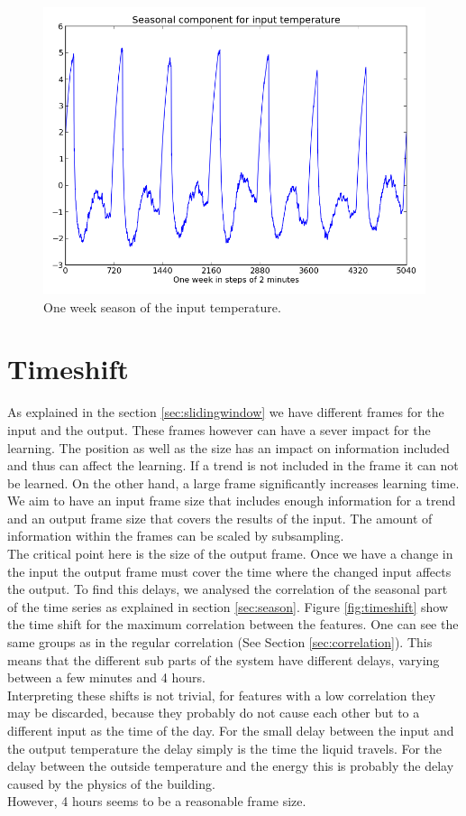 \documentclass{scrartcl}
\begin{document}
\begin{figure}[H]
  \centering
  \includegraphics[width=0.5\linewidth]{img/season-input-temperature.png}
  \caption{One week season of the input temperature.}
  \label{fig:season}
\end{figure}


\section{Timeshift}
As explained in the section \ref{sec:slidingwindow} we have different frames for the input and the output. These frames however can have a sever impact for the learning. The position as well as the size has an impact on information included and thus can affect the learning. If a trend is not included in the frame it can not be learned. On the other hand, a large frame significantly increases learning time. We aim to have an input frame size that includes enough information for a trend and an output frame size that covers the results of the input. The amount of information within the frames can be scaled by subsampling.\\
The critical point here is the size of the output frame. Once we have a change in the input the output frame must cover the time where the changed input affects the output. To find this delays, we analysed the correlation of the seasonal part of the time series as explained in section \ref{sec:season}. Figure \ref{fig:timeshift} show the time shift for the maximum correlation between the features. One can see the same groups as in the regular correlation (See Section \ref{sec:correlation}). This means that the different sub parts of the system have different delays, varying between a few minutes and 4 hours.\\
Interpreting these shifts is not trivial, for features with a low correlation they may be discarded, because they probably do not cause each other but to a different input as the time of the day. For the small delay between the input and the output temperature the delay simply is the time the liquid travels. For the delay between the outside temperature and the energy this is probably the delay caused by the physics of the building.\\
However, 4 hours seems to be a reasonable frame size.
\end{document}
